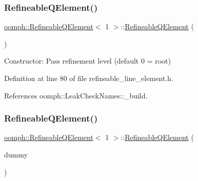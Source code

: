 \subsubsection{\texorpdfstring{Refineable\+Q\+Element()}{RefineableQElement()}\hspace{0.1cm}{\footnotesize\ttfamily [1/2]}}
{\footnotesize\ttfamily \hyperlink{classoomph_1_1RefineableQElement}{oomph\+::\+Refineable\+Q\+Element}$<$ 1 $>$\+::\hyperlink{classoomph_1_1RefineableQElement}{Refineable\+Q\+Element} (\begin{DoxyParamCaption}{ }\end{DoxyParamCaption})\hspace{0.3cm}{\ttfamily [inline]}}



Constructor\+: Pass refinement level (default 0 = root) 



Definition at line 80 of file refineable\+\_\+line\+\_\+element.\+h.



References oomph\+::\+Leak\+Check\+Names\+::\+\_\+build.

\mbox{\label{classoomph_1_1RefineableQElement_3_011_01_4_a2fefa3aae6512105d477884d34fee857}} 
\subsubsection{\texorpdfstring{Refineable\+Q\+Element()}{RefineableQElement()}\hspace{0.1cm}{\footnotesize\ttfamily [2/2]}}
{\footnotesize\ttfamily \hyperlink{classoomph_1_1RefineableQElement}{oomph\+::\+Refineable\+Q\+Element}$<$ 1 $>$\+::\hyperlink{classoomph_1_1RefineableQElement}{Refineable\+Q\+Element} (\begin{DoxyParamCaption}\item[{const \hyperlink{classoomph_1_1RefineableQElement}{Refineable\+Q\+Element}$<$ 1 $>$ \&}]{dummy }\end{DoxyParamCaption})\hspace{0.3cm}{\ttfamily [inline]}}



